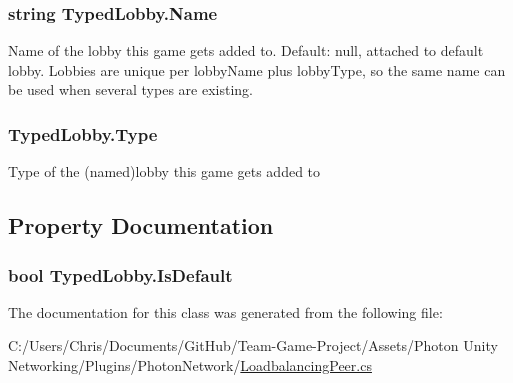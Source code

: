 \subsubsection[{\texorpdfstring{Name}{Name}}]{\setlength{\rightskip}{0pt plus 5cm}string Typed\+Lobby.\+Name}\hypertarget{class_typed_lobby_acd1dfdf3ed901ee8ebe75587fcd0c60b}{}\label{class_typed_lobby_acd1dfdf3ed901ee8ebe75587fcd0c60b}


Name of the lobby this game gets added to. Default\+: null, attached to default lobby. Lobbies are unique per lobby\+Name plus lobby\+Type, so the same name can be used when several types are existing.

\subsubsection[{\texorpdfstring{Type}{Type}}]{ Typed\+Lobby.\+Type}\hypertarget{class_typed_lobby_a6f007dbaead56a950745524463ce5219}{}\label{class_typed_lobby_a6f007dbaead56a950745524463ce5219}


Type of the (named)lobby this game gets added to



\subsection{Property Documentation}
\subsubsection[{\texorpdfstring{Is\+Default}{IsDefault}}]{\setlength{\rightskip}{0pt plus 5cm}bool Typed\+Lobby.\+Is\+Default\hspace{0.3cm}{\ttfamily [get]}}\hypertarget{class_typed_lobby_a73ad6b86a44c2b93d32748ea667c5427}{}\label{class_typed_lobby_a73ad6b86a44c2b93d32748ea667c5427}


The documentation for this class was generated from the following file\+:\begin{DoxyCompactItemize}
\item 
C\+:/\+Users/\+Chris/\+Documents/\+Git\+Hub/\+Team-\/\+Game-\/\+Project/\+Assets/\+Photon Unity Networking/\+Plugins/\+Photon\+Network/\hyperlink{_loadbalancing_peer_8cs}{Loadbalancing\+Peer.\+cs}\end{DoxyCompactItemize}
